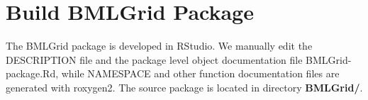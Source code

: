 \documentclass[twocolumn]{article}
\begin{document}
\section{Build BMLGrid Package}
The BMLGrid package is developed in RStudio. We manually edit the
DESCRIPTION file and the package level object documentation file
BMLGrid-package.Rd, while NAMESPACE and other function
documentation files are generated with roxygen2. The source package is located
in directory \textbf{BMLGrid/}.


%
%

\end{document}
